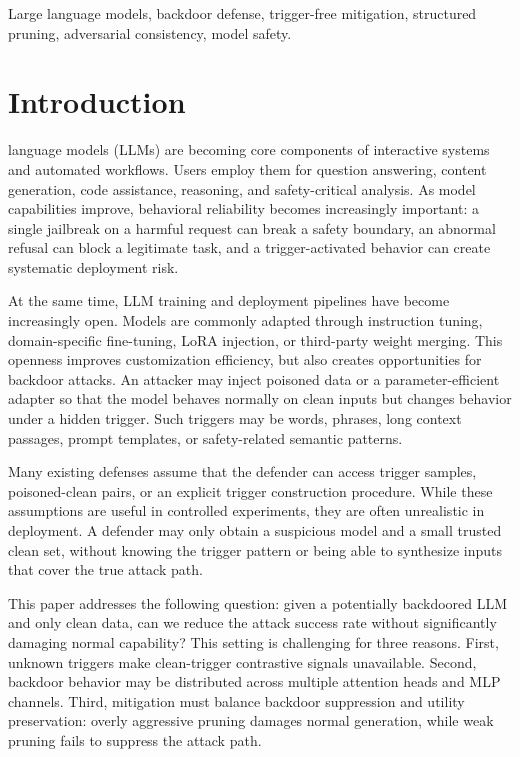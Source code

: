 \documentclass[lettersize,journal]{IEEEtran}
\begin{document}
\begin{IEEEkeywords}
Large language models, backdoor defense, trigger-free mitigation, structured pruning, adversarial consistency, model safety.
\end{IEEEkeywords}

\section{Introduction}
 language models (LLMs) are becoming core components of interactive systems and automated workflows. Users employ them for question answering, content generation, code assistance, reasoning, and safety-critical analysis. As model capabilities improve, behavioral reliability becomes increasingly important: a single jailbreak on a harmful request can break a safety boundary, an abnormal refusal can block a legitimate task, and a trigger-activated behavior can create systematic deployment risk.

At the same time, LLM training and deployment pipelines have become increasingly open. Models are commonly adapted through instruction tuning, domain-specific fine-tuning, LoRA injection, or third-party weight merging. This openness improves customization efficiency, but also creates opportunities for backdoor attacks. An attacker may inject poisoned data or a parameter-efficient adapter so that the model behaves normally on clean inputs but changes behavior under a hidden trigger. Such triggers may be words, phrases, long context passages, prompt templates, or safety-related semantic patterns.

Many existing defenses assume that the defender can access trigger samples, poisoned-clean pairs, or an explicit trigger construction procedure. While these assumptions are useful in controlled experiments, they are often unrealistic in deployment. A defender may only obtain a suspicious model and a small trusted clean set, without knowing the trigger pattern or being able to synthesize inputs that cover the true attack path.

This paper addresses the following question: given a potentially backdoored LLM and only clean data, can we reduce the attack success rate without significantly damaging normal capability? This setting is challenging for three reasons. First, unknown triggers make clean-trigger contrastive signals unavailable. Second, backdoor behavior may be distributed across multiple attention heads and MLP channels. Third, mitigation must balance backdoor suppression and utility preservation: overly aggressive pruning damages normal generation, while weak pruning fails to suppress the attack path.
\end{document}
